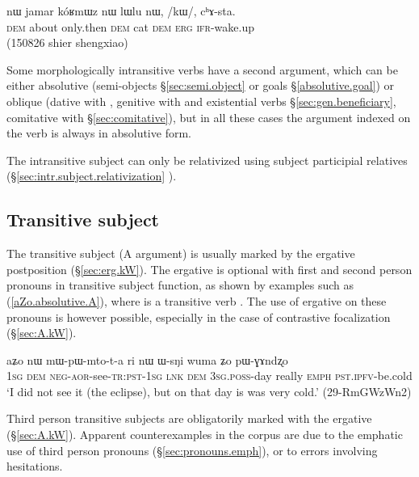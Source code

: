 \begin{exe}
\ex \label{ex:kW.chAsta}
 \gll nɯ jamar kóʁmɯz nɯ lɯlu nɯ, /kɯ/, cʰɤ-sta. \\
 \textsc{dem} about only.then \textsc{dem} cat \textsc{dem} \textsc{erg} \textsc{ifr}-wake.up \\
 \glt (150826 shier shengxiao)
\end{exe}

Some morphologically intransitive verbs have a second argument, which can be either absolutive (semi-objects §\ref{sec:semi.object} or goals §\ref{absolutive.goal}) or oblique (dative with , genitive with  and existential verbs §\ref{sec:gen.beneficiary}, comitative with  §\ref{sec:comitative}), but in all these cases the argument indexed on the verb is always in absolutive form. 

The intransitive subject can only be relativized using subject participial relatives (§\ref{sec:intr.subject.relativization} ).

\subsection{Transitive subject} \label{sec:absolutive.A}
 
The transitive subject (A argument) is usually marked by the ergative postposition  (§\ref{sec:erg.kW}). The ergative is optional with first and second person pronouns in transitive subject function, as shown by examples such as (\ref{aZo.absolutive.A}), where  is a transitive verb . The use of ergative on these pronouns is however possible, especially in the case of contrastive focalization (§\ref{sec:A.kW}).


\begin{exe}
\ex \label{aZo.absolutive.A}
 \gll aʑo nɯ mɯ-pɯ-mto-t-a ri nɯ ɯ-sŋi wuma ʑo pɯ-ɣɤndʐo \\
\textsc{1sg} \textsc{dem} \textsc{neg}-\textsc{aor}-see-\textsc{tr}:\textsc{pst}-\textsc{1sg} \textsc{lnk} \textsc{dem} \textsc{3sg}.\textsc{poss}-day really \textsc{emph} \textsc{pst}.\textsc{ipfv}-be.cold  \\
 \glt `I did not see it (the eclipse), but on that day is was very cold.' (29-RmGWzWn2)
\end{exe}

Third person transitive subjects are obligatorily marked with the ergative  (§\ref{sec:A.kW}). Apparent counterexamples in the corpus are due to the emphatic use of third person pronouns (§\ref{sec:pronouns.emph}), or to errors involving hesitations.

